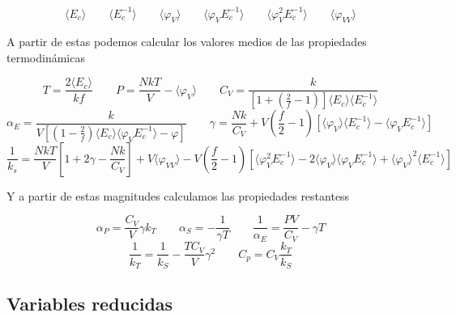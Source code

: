 \documentclass[11pt]{article} %
\newcommand{\parentesis}[1]{\left( #1  \right)}
\newcommand{\ccorchetes}[1]{\left[ #1  \right]}
\newcommand{\dquad}{\quad \quad}
\newcommand{\Ec}{\langle E_c \rangle}
\newcommand{\Ecinv}{\langle E_c^{-1} \rangle}
\newcommand{\varphiV}{\langle \varphi_V \rangle}
\newcommand{\varphiVV}{\langle \varphi_{VV}\rangle}
\newcommand{\varphiVEcinv}{\langle \varphi_V E_c^{-1} \rangle}
\newcommand{\varphiVVEcinv}{ \langle \varphi_V^2 E_c^{-1} \rangle}
\begin{document}
\begin{mybox}
	\begin{equation}
		\langle E_c \rangle \dquad \langle E_c^{-1} \rangle  \dquad \langle \varphi_V \rangle  \dquad \langle \varphi_V E_c^{-1} \rangle \dquad \langle \varphi_V^2 E_c^{-1} \rangle \dquad \langle \varphi_{VV}\rangle \label{Ec:02-01-30}
	\end{equation}
\end{mybox}	
A partir de estas podemos calcular los valores medios de las propiedades termodinámicas

\begin{mybox}
\begin{equation}
	 T = \frac{2\Ec}{kf} \dquad P = \frac{NkT}{V} - \langle \varphi_V \rangle \dquad C_V = \frac{k}{\ccorchetes{1+\parentesis{\frac{2}{f}-1}}\Ec \Ecinv}   \label{Ec:02-01-31}
\end{equation}
\begin{equation*}
\alpha_E  = \frac{k}{V\ccorchetes{\parentesis{1-\frac{2}{f}}\Ec \varphiVEcinv - \varphi }} \dquad
	\gamma  = \frac{Nk}{C_V} + V \parentesis{\frac{f}{2} -1} \ccorchetes{\varphiV \Ecinv - \varphiVEcinv}  
\end{equation*}
\begin{equation*}
	\frac{1}{k_s} = \frac{NkT}{V} \ccorchetes{1+2\gamma - \frac{Nk}{C_V}} + V \varphiVV  - V\parentesis{\frac{f}{2} -1} \ccorchetes{\varphiVVEcinv - 2 \varphiV \varphiVEcinv + \varphiV^2 \Ecinv}
\end{equation*}
\end{mybox}	
Y a partir de estas magnitudes calculamos las propiedades restantess

\begin{mybox}
	\begin{equation}
		\alpha_P = \frac{C_V}{V} \gamma k_T \dquad \alpha_S = - \frac{1}{\gamma T} \dquad \frac{1}{\alpha_E} = \frac{PV}{C_V} - \gamma T \label{Ec:02-01-32}
	\end{equation}
	\begin{equation*}
		\frac{1}{k_T} = \frac{1}{k_S} - \frac{TC_V}{V} \gamma^2 \dquad C_p = C_V \frac{k_T}{k_S}
	\end{equation*}
\end{mybox}

\subsection{Variables reducidas}
\end{document}
